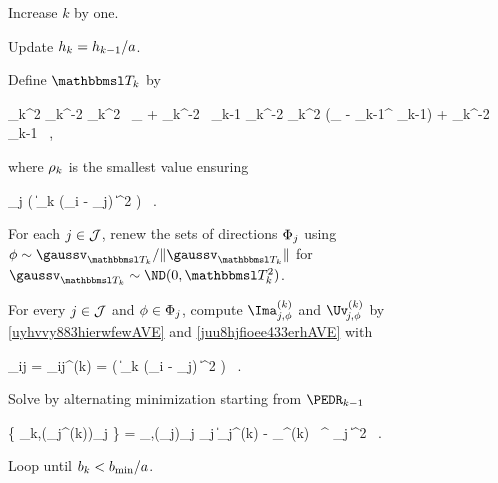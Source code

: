 \begin{mylist}
\item 
Increase \( k \) by one. 

\item
Update \( h_{k} = h_{k-1} / a \).

\item
Define \( \TEDR_{k} \) by
\begin{EQA}[c]
	\TEDR_{k}^{2}
	\eqdef
	\hiso_{k}^{-2} \aniso_{k}^{2} \, \Id_{\dimd} + \hiso_{k}^{-2} \, \JEDR_{k-1}
	\quad
	\quad
	\hiso_{k}^{-2} \aniso_{k}^{2} (\Id_{\dimd} - \PEDR_{k-1}^{\T} \PEDR_{k-1}) + \hiso_{k}^{-2} \, \JEDR_{k-1}
	\, ,
\end{EQA}
where \( \rho_{k} \) is the smallest value ensuring 
\begin{EQA}[c]
	 \sum_{j \in \JJJ} \sumi 
		\Kern\bigl( \| \TEDR_{k} (\Xv_{i} - \xv_{j}) \|^{2} \bigr)
	\geq 
	\nmin
	\, .
\end{EQA}

\item
For each \( j \in \mathcal{J} \), renew the sets of directions \( \Phi_{j} \) using 
\( \sph \sim \gaussv_{\TEDR_{k}}/\| \gaussv_{\TEDR_{k}} \| \) for \( \gaussv_{\TEDR_{k}} \sim \ND(0,\TEDR_{k}^{2}) \).

\item 
For every \( j \in \mathcal{J} \) and \( \phi \in \Phi_{j} \), compute \( \Ima_{j,\sph}^{(k)} \) and \( \Uv_{\jm,\sph}^{(k)} \) by \eqref{uyhvvy883hierwfewAVE} and \eqref{juu8hjfioee433erhAVE} 
with 
\begin{EQA}[c]
	\weight_{ij} 
	= 
	\weight_{ij}^{(k)}
	= 
	\Kern\bigl( \| \TEDR_{k} (\Xv_{i} - \xv_{j}) \|^{2} \bigr) 
	\, .
\end{EQA}

\item 
Solve by alternating minimization starting from \( \PEDR_{k-1} \)
\begin{EQA}[c]
	\{ \PEDR_{k},(\fclv_{j}^{(k)})_{j \in \JJJ} \} 
	=
	\arginf_{\PEDR,(\fclv_{j})_{j \in \JJJ}} 
	\sum_{j \in \JJJ} \bigl\| \Imav_{j}^{(k)} - \UV_{\jm}^{(k)} \, \PEDR^{\T} \fclv_{j} \bigr\|^{2}
	\, .
\end{EQA}


\item
Loop until \( b_{k} < b_{\min}/a \).

\end{mylist}
